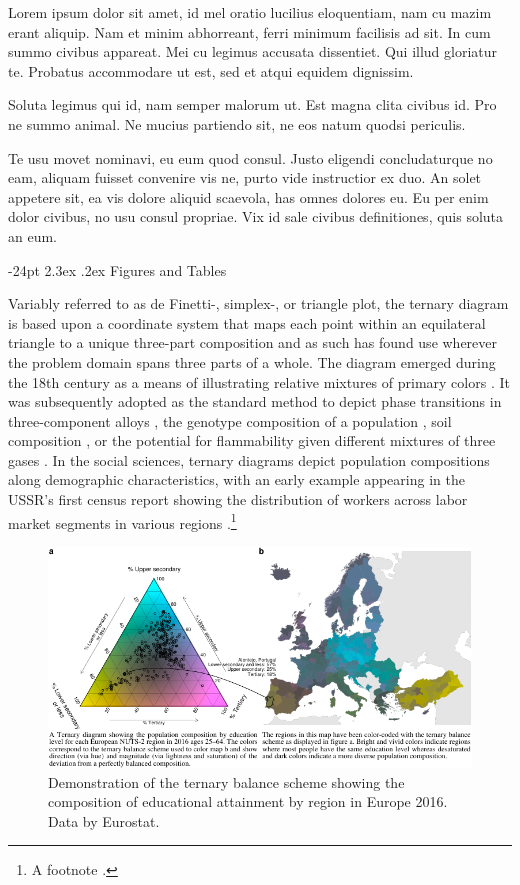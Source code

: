 \documentclass[10pt,twoside,reqno]{article}
\makeatletter
\def\cnstmaxfigwidth{
      \ifdim \Gin@nat@width>\linewidth
        \linewidth
      \else \Gin@nat@width
      \fi
    }
\let\Oldincludegraphics\includegraphics
\renewcommand{\includegraphics}[1]{\Oldincludegraphics[width=\cnstmaxfigwidth]{#1}}
\renewcommand\section{\@startsection {section}{1}{\z@}%
                                   {-24pt}%
                                   {2.3ex \@plus.2ex}%
                                   {\normalfont\large\bfseries}}
\makeatother
\begin{document}
Lorem ipsum dolor sit amet, id mel oratio lucilius eloquentiam, nam cu mazim erant aliquip. Nam et minim abhorreant, ferri minimum facilisis ad sit. In cum summo civibus appareat. Mei cu legimus accusata dissentiet. Qui illud gloriatur te. Probatus accommodare ut est, sed et atqui equidem dignissim.

Soluta legimus qui id, nam semper malorum ut. Est magna clita civibus id. Pro ne summo animal. Ne mucius partiendo sit, ne eos natum quodsi periculis.

Te usu movet nominavi, eu eum quod consul. Justo eligendi concludaturque no eam, aliquam fuisset convenire vis ne, purto vide instructior ex duo. An solet appetere sit, ea vis dolore aliquid scaevola, has omnes dolores eu. Eu per enim dolor civibus, no usu consul propriae. Vix id sale civibus definitiones, quis soluta an eum.

\hypertarget{figures-and-tables}{%
\section{Figures and Tables}\label{figures-and-tables}}

Variably referred to as de Finetti-, simplex-, or triangle plot, the ternary diagram is based upon a coordinate system that maps each point within an equilateral triangle to a unique three-part composition and as such has found use wherever the problem domain spans three parts of a whole. The diagram emerged during the 18th century as a means of illustrating relative mixtures of primary colors \citep{Howarth1996}. It was subsequently adopted as the standard method to depict phase transitions in three-component alloys \citep{Bancroft1897}, the genotype composition of a population \citep{DeFinetti1926}, soil composition \citep{Davis1927}, or the potential for flammability given different mixtures of three gases \citep{Zabetakis1965}. In the social sciences, ternary diagrams depict population compositions along demographic characteristics, with an early example appearing in the USSR's first census report showing the distribution of workers across labor market segments in various regions \citep{Kvitkin1932}.\footnote{A footnote \citep{Ware2013, Denil2015}.}

\begin{figure}
\centering
\includegraphics{figure1.pdf}
\caption{\label{fig:unnamed-chunk-2}Demonstration of the ternary balance scheme showing the composition of educational attainment by region in Europe 2016. Data by Eurostat.}
\end{figure}
\end{document}
